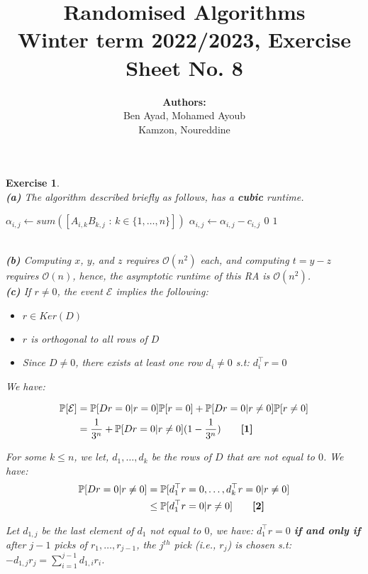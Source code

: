 \documentclass{article}
\title{Randomised Algorithms \\
Winter term 2022/2023, Exercise Sheet No. 8}
\author{
    \textbf{Authors:} \\
    Ben Ayad, Mohamed Ayoub \\
    Kamzon, Noureddine
}
\newtheorem{exo}{Exercise}
\def\P{\mathbb{P}}
\begin{document}
\maketitle

\begin{exo}{\ \\}
\noindent
\textbf{(a)}  The algorithm described briefly as follows, has a \textbf{cubic} runtime.

\begin{algorithmic}[1]
    \State $\alpha_{i,j} \gets sum([A_{i,k}B_{k,j} \text{ : } k \in \{1,\dots ,n\}])$ 
    \State $\alpha_{i,j} \gets \alpha_{i,j} - c_{i,j}$
    \State \Return $0$
\EndIf
\EndFor 
\State \Return $1$
\end{algorithmic}

\noindent
\\\textbf{(b)}  Computing $x$, $y$, and $z$ requires $\mathcal{O}(n^2)$ each, and computing $t = y-z$ requires $\mathcal{O}(n)$, hence, the asymptotic runtime of this RA is $\mathcal{O}(n^2)$.\\

\noindent
\textbf{(c)} If $r \neq 0$, the event $\mathcal{E}$ implies the following:
\begin{itemize}
    \item $r \in Ker(D)$
    \item $r$ is orthogonal to all rows of $D$
    \item Since $D \neq 0$, there exists at least one row $d_i \neq 0$ s.t: $d_i^\top r = 0$
\end{itemize}

We have:

\begin{align*}
    \P[\mathcal{E}] 
    &= \P[Dr=0|r=0]\P[r=0] + \P[Dr=0|r\neq0]\P[r\neq0] \\
    &= \frac{1}{3^n} + \P[Dr=0|r\neq0](1-\frac{1}{3^n}) \quad \quad  \text{\textbf{[1]}}
\end{align*}


For some $k\leq n$, we let, $d_1, \dots, d_k$  be the rows of $D$ that are not equal to $0$. We have:
\begin{align*}
    \P[Dr=0|r\neq0]
    &= \P[d_1^\top r = 0, \dots, d_k^\top r = 0 |  r\neq0] \\
    &\leq \P[d_1^\top r = 0 | r\neq0]    \quad \quad  \text{\textbf{[2]}}
\end{align*}

Let $d_{1,j}$ be the last element of $d_1$ not equal to $0$, we have: $d_1^\top r=0$ \textbf{if and only if} after $j-1$ picks of $r_1, \dots , r_{j-1}$, the $j^{th}$ pick (i.e., $r_j$) is chosen s.t:   $-d_{1,j} r_j = \sum^{j-1}_{i=1} d_{1,i} r_i $.


\end{exo}
\end{document}
